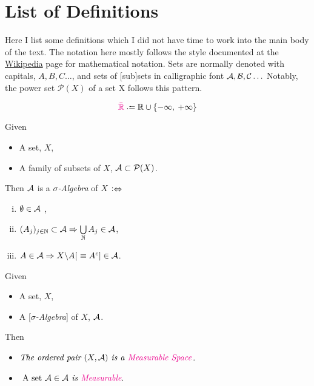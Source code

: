 
\section{List of Definitions}
Here I list some definitions which I did not have time to work into the main body of the text. The notation here mostly follows the style documented at the \href{https://en.wikipedia.org/wiki/List_of_mathematical_symbols}{Wikipedia} page for mathematical notation. Sets are normally denoted with capitals, $A, B, C\ldots$, and sets of [sub]sets in calligraphic font $\mathcal{A}, \mathcal{B}, \mathcal{C}\ldots$ Notably, the power set $\mathcal{P}(X)$ of a set X follows this pattern.

\begin{definition}\label{def:eRealLine}
$${\color{Magenta}\eR} \defeq \R \cup \{-\infty,\> +\infty\}$$
\end{definition}

\begin{definition}\label{def:salgebra}
Given
\begin{itemize}
\item
	A set, $X$,
\item
	A family of subsets of $X$, $\mathcal{A} \subset \mathcal{P}(X)$.
\end{itemize}
Then $\mathcal{A}$ is a {\color{Magenta}\emph{$\sigma$-Algebra}} of $X$ $\mathrel{\vcentcolon\Leftrightarrow}$
\begin{enumerate}[(i)]
\centering
\item
	$\emptyset \in \mathcal{A}$ \vspace{2pt},
\item
	$(A_j)_{j\in\mathbb{N}} \subset \mathcal{A} \Rightarrow \bigcup\limits_{\mathbb{N}} A_j \in \mathcal{A}$,
\item
	$A \in \mathcal{A} \Rightarrow  X\backslash{}A [\ \equiv A^c] \in \mathcal{A}$.
\end{enumerate}
\end{definition}

\begin{definition}\label{def:mablespace}
Given
\begin{itemize}
\item
	A set, $X$,
\item
	A [\emph{$\sigma$-Algebra}] of $X$, $\mathcal{A}$.
\end{itemize}
Then
\begin{itemize}
\item
	$\text{\it The ordered pair }(X, \A) \text{\it \ is a {\color{Magenta}Measurable Space}}$.
\item
	$\text{ A set }\A \in \A \text{\it\ is {\color{Magenta}Measurable}}.$
\end{itemize}
\end{definition}

